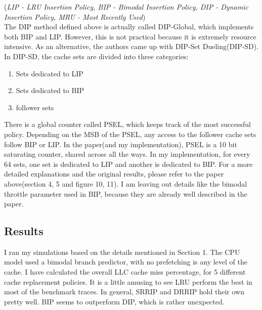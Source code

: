 \documentclass[a4paper]{article}
\begin{document}
        {\centering(\textit{LIP - LRU Insertion Policy, BIP - Bimodal Insertion Policy, DIP - Dynamic Insertion Policy, MRU - Most Recently Used})}\\
        
        The DIP method defined above is actually called DIP-Global, which implements both BIP and LIP. However, this is not practical because it is extremely resource intensive. As an alternative, the authors came up with DIP-Set Dueling(DIP-SD). In DIP-SD, the cache sets are divided into three categories:
        \begin{enumerate}
            \item Sets dedicated to LIP
            \item Sets dedicated to BIP
            \item follower sets
        \end{enumerate}
        
        There is a global counter called PSEL, which keeps track of the most successful policy. Depending on the MSB of the PSEL, any access to the follower cache sets follow BIP or LIP. In the paper(and my implementation), PSEL is a 10 bit saturating counter, shared across all the ways. In my implementation, for every 64 sets, one set is dedicated to LIP and another is dedicated to BIP. For a more detailed explanations and the original results, please refer to the paper above(section 4, 5 and figure 10, 11). I am leaving out details like the bimodal throttle parameter used in BIP, because they are already well described in the paper.
        
        \subsection{Results}
            I ran my simulations based on the details mentioned in Section 1. The CPU model used a bimodal branch predictor, with no prefetching is any level of the cache. I have calculated the overall LLC cache miss percentage, for 5 different cache replacement policies. It is a little amusing to see LRU perform the best in most of the benchmark traces. In general, SRRIP and DRRIP hold their own pretty well. BIP seems to outperform DIP, which is rather unexpected.
            
\end{document}
